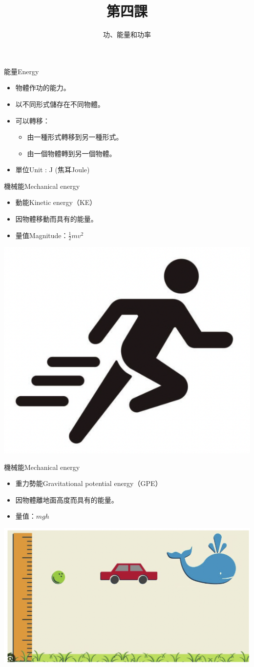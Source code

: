 \documentclass[beamer=true]{standalone}
\title{第四課}
\author{功、能量和功率}
\institute{全年班}
\date{}
\begin{document}
\frame{\titlepage}


\begin{frame}{能量Energy}
    \begin{itemize}
        \item 物體作功的能力。
        \item 以不同形式儲存在不同物體。
        \item 可以轉移：
              \begin{itemize}
                  \item 由一種形式轉移到另一種形式。
                  \item 由一個物體轉到另一個物體。
              \end{itemize}
        \item 單位Unit : J (焦耳Joule)
    \end{itemize}
\end{frame}

\begin{frame}{機械能Mechanical energy}
    \begin{itemize}
        \item 動能Kinetic energy（KE）
        \item 因物體移動而具有的能量。
        \item 量值Magnitude：$\frac{1}{2}mv^2$
    \end{itemize}\bigskip
    {\par\centering
        \includegraphics[width=.3\textwidth]{assets/8ff24777.png}
        \par}
\end{frame}

\begin{frame}{機械能Mechanical energy}
    \begin{itemize}
        \item 重力勢能Gravitational potential energy（GPE）
        \item 因物體離地面高度而具有的能量。
        \item 量值：$mgh$
    \end{itemize}\bigskip
    {\par\centering
        \includegraphics[width=.5\textwidth]{assets/86718add.png}
        \par}
\end{frame}
\end{document}
